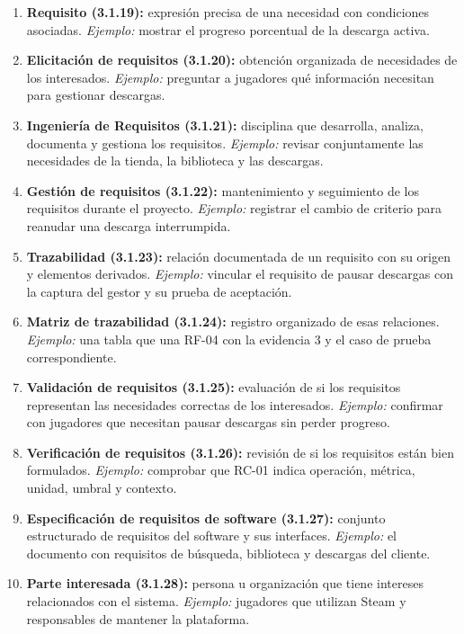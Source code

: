 \documentclass[12pt,a4paper]{article}
\begin{document}
\begin{enumerate}[leftmargin=*,itemsep=6pt]
\item \textbf{Requisito (3.1.19):} expresión precisa de una necesidad con condiciones asociadas. \textit{Ejemplo:} mostrar el progreso porcentual de la descarga activa.
\item \textbf{Elicitación de requisitos (3.1.20):} obtención organizada de necesidades de los interesados. \textit{Ejemplo:} preguntar a jugadores qué información necesitan para gestionar descargas.
\item \textbf{Ingeniería de Requisitos (3.1.21):} disciplina que desarrolla, analiza, documenta y gestiona los requisitos. \textit{Ejemplo:} revisar conjuntamente las necesidades de la tienda, la biblioteca y las descargas.
\item \textbf{Gestión de requisitos (3.1.22):} mantenimiento y seguimiento de los requisitos durante el proyecto. \textit{Ejemplo:} registrar el cambio de criterio para reanudar una descarga interrumpida.
\item \textbf{Trazabilidad (3.1.23):} relación documentada de un requisito con su origen y elementos derivados. \textit{Ejemplo:} vincular el requisito de pausar descargas con la captura del gestor y su prueba de aceptación.
\item \textbf{Matriz de trazabilidad (3.1.24):} registro organizado de esas relaciones. \textit{Ejemplo:} una tabla que una RF-04 con la evidencia 3 y el caso de prueba correspondiente.
\item \textbf{Validación de requisitos (3.1.25):} evaluación de si los requisitos representan las necesidades correctas de los interesados. \textit{Ejemplo:} confirmar con jugadores que necesitan pausar descargas sin perder progreso.
\item \textbf{Verificación de requisitos (3.1.26):} revisión de si los requisitos están bien formulados. \textit{Ejemplo:} comprobar que RC-01 indica operación, métrica, unidad, umbral y contexto.
\item \textbf{Especificación de requisitos de software (3.1.27):} conjunto estructurado de requisitos del software y sus interfaces. \textit{Ejemplo:} el documento con requisitos de búsqueda, biblioteca y descargas del cliente.
\item \textbf{Parte interesada (3.1.28):} persona u organización que tiene intereses relacionados con el sistema. \textit{Ejemplo:} jugadores que utilizan Steam y responsables de mantener la plataforma.
\end{enumerate}
\end{document}
